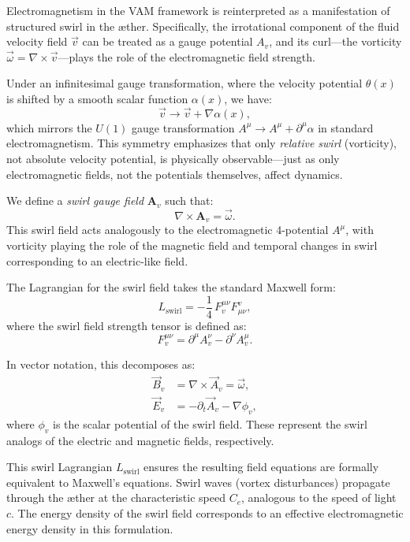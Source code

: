 Electromagnetism in the VAM framework is reinterpreted as a manifestation of structured swirl in the æther. Specifically, the irrotational component of the fluid velocity field \( \vec{v} \) can be treated as a gauge potential \( A_v \), and its curl—the vorticity \( \vec{\omega} = \nabla \times \vec{v} \)—plays the role of the electromagnetic field strength.

Under an infinitesimal gauge transformation, where the velocity potential \( \theta(x) \) is shifted by a smooth scalar function \( \alpha(x) \), we have:
\[
\vec{v} \to \vec{v} + \nabla \alpha(x),
\]
which mirrors the $U(1)$ gauge transformation \( A^\mu \to A^\mu + \partial^\mu \alpha \) in standard electromagnetism. This symmetry emphasizes that only \textit{relative swirl} (vorticity), not absolute velocity potential, is physically observable—just as only electromagnetic fields, not the potentials themselves, affect dynamics.

\vspace{1em}
We define a \emph{swirl gauge field} \( \mathbf{A}_v \) such that:
\[
\nabla \times \mathbf{A}_v = \vec{\omega}.
\]
This swirl field acts analogously to the electromagnetic 4-potential \( A^\mu \), with vorticity playing the role of the magnetic field and temporal changes in swirl corresponding to an electric-like field.

The Lagrangian for the swirl field takes the standard Maxwell form:
\begin{equation}
    L_{\text{swirl}} = -\frac{1}{4}\, F_{v}^{\mu\nu} F^{v}_{\mu\nu},
    \label{eq:swirl-lagrangian}
\end{equation}
where the swirl field strength tensor is defined as:
\[
F_v^{\mu\nu} = \partial^\mu A_v^\nu - \partial^\nu A_v^\mu.
\]

In vector notation, this decomposes as:
\begin{align*}
    \vec{B}_v &= \nabla \times \vec{A}_v = \vec{\omega}, \\
    \vec{E}_v &= -\partial_t \vec{A}_v - \nabla \phi_v,
\end{align*}
where \( \phi_v \) is the scalar potential of the swirl field. These represent the swirl analogs of the electric and magnetic fields, respectively.

\vspace{1em}
This swirl Lagrangian \( L_{\text{swirl}} \) ensures the resulting field equations are formally equivalent to Maxwell's equations. Swirl waves (vortex disturbances) propagate through the æther at the characteristic speed \( C_e \), analogous to the speed of light \( c \). The energy density of the swirl field corresponds to an effective electromagnetic energy density in this formulation.

